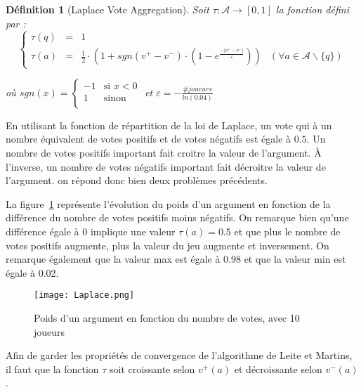 \documentclass[11pt]{article}
\theoremstyle{defi}
\newtheorem{definition}{Définition}[section]
\theoremstyle{not}
\theoremstyle{prob}
\begin{document}
    \begin{definition}[Laplace Vote Aggregation]
      Soit $\tau : \mathcal{A} \rightarrow [0, 1]$ la fonction défini par :
      $$
        \left\{\begin{array}{llll}
          \tau(q) & = & 1 & \\
          \tau(a) & = & \frac{1}{2} \cdot \left(1 + sgn(v^+ - v^-) \cdot \left(1 - e^{\frac{-|v^+ - v^-|}{\varepsilon}}\right)\right) & (\forall a \in \mathcal{A} \backslash \{q\})
        \end{array}\right.
      $$

      où
      $sgn(x) = \left\{
        \begin{array}{ll}
          -1  & \mbox{si } x < 0 \\
          1 & \mbox{sinon} \\
        \end{array}
      \right.$
      et $\varepsilon = - \frac{\#joueurs}{ln(0.04)}$

    \end{definition}

    En utilisant la fonction de répartition de la loi de Laplace, un vote qui à un nombre équivalent de votes positifs et de votes négatifs est égale à $0.5$. Un nombre de votes positifs important fait croitre la valeur de l'argument. À l'inverse, un nombre de votes négatifs important fait décroitre la valeur de l'argument.
    on répond donc bien deux problèmes précédents.

    La figure~\ref{fig:Laplace} représente l'évolution du poids d'un argument en fonction de la différence du nombre de votes positifs moins négatifs.
    On remarque bien qu'une différence égale à 0 implique une valeur $\tau(a) = 0.5$ et que plus le nombre de votes positifs augmente, plus la valeur du jeu augmente et inversement.
    On remarque également que la valeur max est égale à $0.98$ et que la valeur min est égale à 0.02.

    \begin{figure}
      \center
      \texttt{[image: Laplace.png]}
      \label{fig:Laplace}
      \caption{Poids d'un argument en fonction du nombre de votes, avec 10 joueurs}
    \end{figure}


    Afin de garder les propriétés de convergence de l'algorithme de Leite et Martins, il faut que la fonction $\tau$ soit croissante selon $v^+(a)$ et décroissante selon $v^-(a)$.
\end{document}
